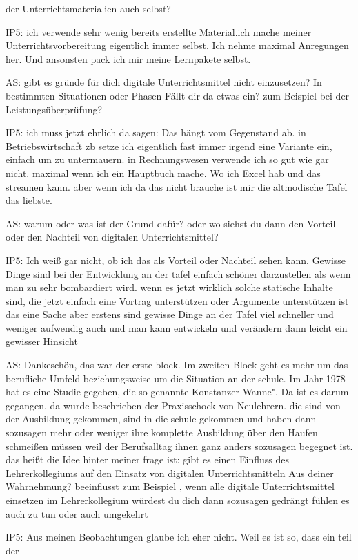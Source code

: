 \documentclass[fontsize=11pt,paper=a4]{scrbook}
\begin{document}
{\begin{itemize*}
der Unterrichtsmaterialien auch selbst?
\item[IP5:] ich verwende sehr wenig bereits
erstellte Material.ich mache meiner
Unterrichtsvorbereitung eigentlich immer
selbst. Ich nehme maximal Anregungen her. Und ansonsten pack ich mir meine Lernpakete selbst.
\item[AS:] gibt es gründe für dich
digitale Unterrichtsmittel nicht einzusetzen? In bestimmten Situationen oder Phasen Fällt dir da etwas ein? zum Beispiel bei 
der Leistungsüberprüfung?
\item[IP5:] ich muss
jetzt ehrlich da sagen: Das hängt vom Gegenstand ab. in Betriebswirtschaft zb
setze ich eigentlich fast immer irgend
eine Variante ein, einfach um zu
untermauern. 
in Rechnungswesen verwende ich so gut
wie gar nicht. maximal wenn ich ein Hauptbuch mache. Wo ich Excel hab und das streamen kann. aber wenn ich da das nicht brauche
ist mir die altmodische Tafel das liebste.
\item[AS:] warum oder was ist der
Grund dafür? oder wo siehst
du dann den Vorteil oder den Nachteil von digitalen Unterrichtsmittel?
\item[IP5:] Ich weiß gar nicht, ob ich das als Vorteil oder Nachteil sehen kann. Gewisse
Dinge sind bei der Entwicklung an der
tafel einfach schöner darzustellen als wenn
man zu sehr bombardiert wird. wenn es
jetzt wirklich solche statische Inhalte
sind, die jetzt einfach eine Vortrag unterstützen oder Argumente unterstützen
ist das eine Sache aber erstens sind
gewisse Dinge an der Tafel viel schneller und weniger
aufwendig auch und man kann entwickeln und verändern
dann leicht ein gewisser Hinsicht
\item[AS:] Dankeschön, das war der erste block. Im zweiten Block geht es mehr um das berufliche Umfeld beziehungsweise um die
Situation an der schule. Im Jahr 1978 hat es eine Studie gegeben, die so
genannte Konstanzer Wanne". Da ist es darum
gegangen, da wurde beschrieben der
Praxisschock von Neulehrern. die sind von der Ausbildung gekommen, sind in die schule gekommen und haben dann 
sozusagen mehr oder weniger ihre
komplette Ausbildung über den Haufen
schmeißen müssen weil der Berufsalltag
ihnen ganz anders sozusagen begegnet ist.
das heißt die Idee hinter
meiner frage ist: gibt es einen
Einfluss des Lehrerkollegiums auf den
Einsatz von digitalen Unterrichtsmitteln Aus deiner Wahrnehmung?
beeinflusst zum Beispiel , wenn alle digitale
Unterrichtsmittel einsetzen im
Lehrerkollegium würdest du dich dann
sozusagen gedrängt fühlen es auch zu tun oder
auch umgekehrt
\item[IP5:] Aus meinen Beobachtungen glaube ich eher nicht. Weil es ist so, dass ein teil der

\end{itemize*}}
\end{document}
